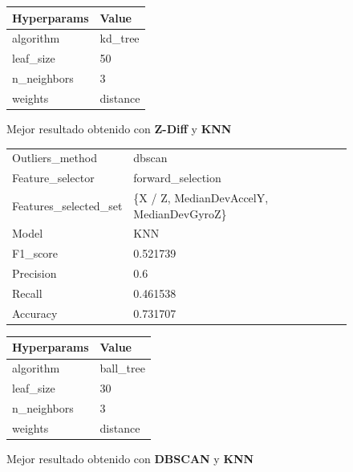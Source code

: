 \begin{appendices}
\begin{figure}[htb]
			\begin{tabular}{ll}
				\toprule
				Hyperparams &    Value \\
				\midrule
				  algorithm &  kd\_tree \\
				  leaf\_size &       50 \\
				n\_neighbors &        3 \\
					weights & distance \\
				\bottomrule
			\end{tabular}
			\caption{Mejor resultado obtenido con \textbf{Z-Diff} y \textbf{KNN}}
			\label{table:18}
		\end{figure}

		\begin{figure}[htb]
			\centering
			\begin{tabular}{ll}
				\toprule
					  Outliers\_method &                                   dbscan \\
					 Feature\_selector &                        forward\_selection \\
				Features\_selected\_set & \{X / Z, MedianDevAccelY, MedianDevGyroZ\} \\
								Model &                                      KNN \\
						F1\_score &                                 0.521739 \\
					   Precision &                                      0.6 \\
						  Recall &                                 0.461538 \\
						Accuracy &                                 0.731707 \\
				\bottomrule
			\end{tabular}
			\newline
			\newline

			\begin{tabular}{ll}
				\toprule
				Hyperparams &     Value \\
				\midrule
				  algorithm & ball\_tree \\
				  leaf\_size &        30 \\
				n\_neighbors &         3 \\
					weights &  distance \\
				\bottomrule
			\end{tabular}
			\caption{Mejor resultado obtenido con \textbf{DBSCAN} y \textbf{KNN}}
			\label{table:19}
		\end{figure}


\end{appendices}
